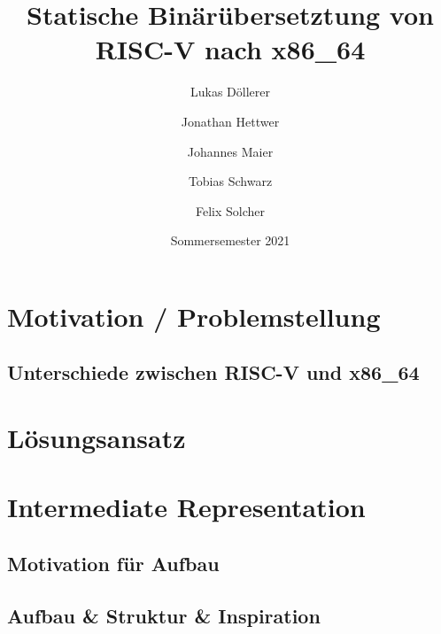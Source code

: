 \documentclass[course=eragp]{aspdoc}
\author{Lukas Döllerer \and Jonathan Hettwer \and Johannes Maier \and Tobias Schwarz \and Felix Solcher}
\date{Sommersemester 2021}
\title{Statische Binärübersetztung von RISC-V nach x86\_64}
\begin{document}
\maketitle










\section{Motivation / Problemstellung}
\subsection{Unterschiede zwischen RISC-V und x86\_64}

\section{Lösungsansatz}

\section{Intermediate Representation}
\subsection{Motivation für Aufbau}
\subsection{Aufbau \& Struktur \& Inspiration}
\end{document}
